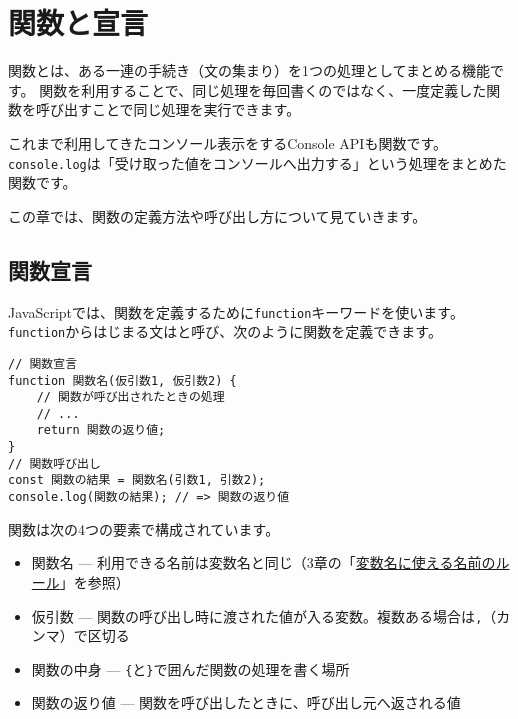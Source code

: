 \hypertarget{function-and-declaration}{%
\chapter{関数と宣言}\label{function-and-declaration}}
\thispagestyle{frontheadings}

関数とは、ある一連の手続き（文の集まり）を1つの処理としてまとめる機能です。
関数を利用することで、同じ処理を毎回書くのではなく、一度定義した関数を呼び出すことで同じ処理を実行できます。

これまで利用してきたコンソール表示をするConsole APIも関数です。
\texttt{console.log}は「受け取った値をコンソールへ出力する」という処理をまとめた関数です。

この章では、関数の定義方法や呼び出し方について見ていきます。

\hypertarget{function-declaration}{%
\section{関数宣言}\label{function-declaration}}

JavaScriptでは、関数を定義するために\texttt{function}キーワードを使います。
\texttt{function}からはじまる文は\textbf{}と呼び、次のように関数を定義できます。

\begin{lstlisting}
// 関数宣言
function 関数名(仮引数1, 仮引数2) {
    // 関数が呼び出されたときの処理
    // ...
    return 関数の返り値;
}
// 関数呼び出し
const 関数の結果 = 関数名(引数1, 引数2);
console.log(関数の結果); // => 関数の返り値
\end{lstlisting}

関数は次の4つの要素で構成されています。

\begin{itemize}
\item
  関数名 ---
  利用できる名前は変数名と同じ（3章の「\hyperlink{variable-name}{変数名に使える名前のルール}」を参照）
\item
  仮引数 ---
  関数の呼び出し時に渡された値が入る変数。複数ある場合は\texttt{,}（カンマ）で区切る
\item
  関数の中身 ---
  \texttt{\{}と\texttt{\}}で囲んだ関数の処理を書く場所
\item
  関数の返り値 --- 関数を呼び出したときに、呼び出し元へ返される値
\end{itemize}

